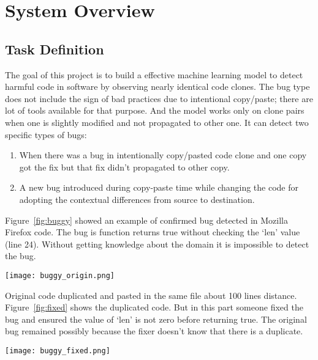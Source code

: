 \documentclass[nocopyrightspace]{sigplanconf}
\begin{document}
\section{System Overview}
\subsection{Task Definition}
The goal of this project is to build a effective machine learning model to detect harmful code in software by observing nearly identical code clones. The bug type does not include the sign of bad practices due to intentional copy/paste; there are lot of tools available for that purpose. And the model works only on clone pairs when one is slightly modified and not propagated to other one. It can detect two specific types of bugs:

\begin{enumerate}
\item When there was a bug in intentionally copy/pasted code clone and one copy got the fix but that fix didn’t propagated to other copy.
\item A new bug introduced during copy-paste time while changing the code for adopting the contextual differences from source to destination.
\end{enumerate}

\vspace{10 pt}
\noindent
Figure~\ref{fig:buggy} showed an example of confirmed bug detected in Mozilla Firefox code. The bug is function returns true without checking the ‘len’ value (line 24). Without getting knowledge about the domain it is impossible to detect the bug.

\begin{figure*}[t!]
\centering
\texttt{[image: buggy\_origin.png]}
\caption{Buggy copy of the clone}
\label{fig:buggy}
\end{figure*}

\vspace{10 pt}
\noindent
Original code duplicated and pasted in the same file about 100 lines distance. Figure~\ref{fig:fixed} shows the duplicated code. But in this part someone fixed the bug and ensured the value of ‘len’ is not zero before returning true. The original bug remained possibly because the fixer doesn’t know that there is a duplicate.

\begin{figure*}[t!]
\centering
\texttt{[image: buggy\_fixed.png]}
\caption{Fixed copy of the clone}
\label{fig:fixed}
\end{figure*}
\end{document}
